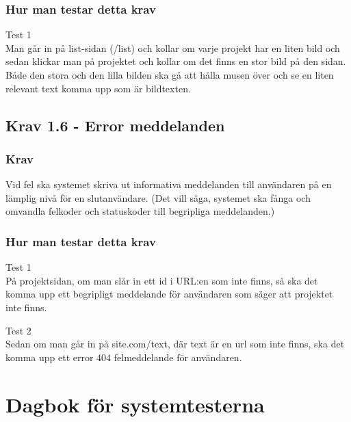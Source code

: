 \documentclass{TDP003mall}
\begin{document}
        \subsubsection{Hur man testar detta krav}
        
        Test 1\\
        Man går in på list-sidan (/list) och kollar om varje projekt har en liten bild och sedan klickar man på projektet och kollar om det finns en stor bild på den sidan. Både den stora och den lilla bilden ska gå att hålla musen över och se en liten relevant text komma upp som är bildtexten. 
    
    \subsection{Krav 1.6 - Error meddelanden}
    
        \subsubsection{Krav}
        Vid fel ska systemet skriva ut informativa meddelanden till användaren på
        en lämplig nivå för en slutanvändare. (Det vill säga, systemet ska fånga
        och omvandla felkoder och statuskoder till begripliga meddelanden.)
    
        \subsubsection{Hur man testar detta krav}
        
        Test 1\\
        På projektsidan, om man slår in ett id i URL:en som inte finns, så ska det komma upp ett begripligt meddelande för användaren som säger att projektet inte finns. 
        
        Test 2\\
        Sedan om man går in på site.com/text, där text är en url som inte finns, ska det komma upp ett error 404 felmeddelande för användaren.


\newpage
\section{Dagbok för systemtesterna}
\end{document}
